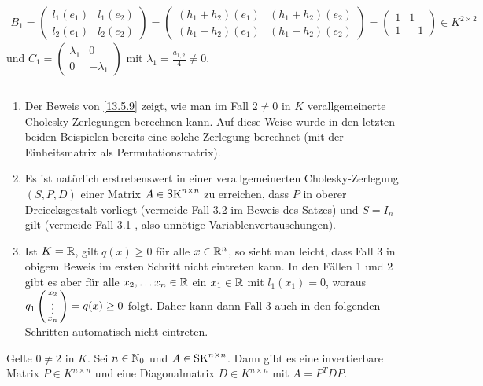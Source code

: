 \documentclass[../../main.tex]{subfiles}
\begin{document}
\begin{cproof}
	\begin{align*}
		B_1=\begin{pmatrix*}l_1(e_1) & l_1(e_2)\\ l_2(e_1) & l_2(e_2)\end{pmatrix*}=\begin{pmatrix*}(h_1+h_2)(e_1) & (h_1+h_2)(e_2)\\ (h_1-h_2)(e_1) & (h_1-h_2)(e_2)\end{pmatrix*}=\begin{pmatrix} 1 & 1 \\ 1 &  -1\end{pmatrix}\in K^{2\times 2}
	\end{align*}
	und $C_1=\begin{pmatrix}\lambda_1 & 0\\ 0 & -\lambda_1\end{pmatrix}$ mit $\lambda_1=\frac{a_{1,2}}{4}\neq 0$.
\end{cproof}

\begin{bem}\label{13.5.10}
	$\,$
	\begin{enumerate}[\normalfont(a)]
		\item Der Beweis von \ref{13.5.9} zeigt, wie man im Fall $2\neq 0$ in $K$ verallgemeinerte Cholesky-Zerlegungen berechnen kann. Auf diese Weise wurde in den letzten beiden Beispielen bereits eine solche Zerlegung berechnet (mit der Einheitsmatrix als Permutationsmatrix).
		\item Es ist natürlich erstrebenswert in einer verallgemeinerten Cholesky-Zerlegung $(S,P,D)$ einer Matrix $A\in \operatorname{SK}^{n\times n}$ zu erreichen, dass $P$ in oberer Dreiecksgestalt vorliegt (vermeide Fall 3.2 im Beweis des Satzes) und $S=I_n$ gilt (vermeide Fall 3.1 , also unnötige Variablenvertauschungen).
		\item Ist $K=\mathbb R$, gilt $q(x)\ge 0$ für alle $x\in \mathbb R^n$, so sieht man leicht, dass Fall 3 in obigem Beweis im ersten Schritt nicht eintreten kann. In den Fällen 1 und 2 gibt es aber für alle $x_2,\ldots x_n\in \mathbb R$  ein $x_1\in \mathbb R$ mit $l_1(x_1)=0$, woraus $q_1\left(\begin{smallmatrix}x_2\\\vdots\\x_n\end{smallmatrix}\right)=q(x)\ge 0$ folgt. Daher kann dann Fall 3 auch in den folgenden Schritten automatisch nicht eintreten.
	\end{enumerate}
\end{bem}

\begin{kor}\label{13.5.11}
	Gelte $0\neq 2$ in $K$. Sei $n\in \mathbb N_0$ und $A\in \operatorname{SK}^{n\times n}$. Dann gibt es eine invertierbare Matrix $P\in K^{n\times n}$ und eine Diagonalmatrix $D\in K^{n\times n}$ mit $A=P^TDP$.
\end{kor}
	
\end{document}
